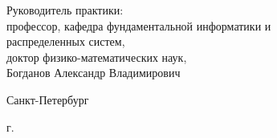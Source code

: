 \begin{titlepage}
\begin{center}
\begin{flushright}
\begin{minipage}[t]{0.65\textwidth}
\vspace{10mm}

{Руководитель практики:} \\
профессор, кафедра фундаментальной информатики и\\ распределенных систем,\\ доктор физико-математических наук, \\Богданов Александр Владимирович
\end{minipage}
\end{flushright}

\vfill 

{Санкт-Петербург}
\par{\the\year{} г.}
\end{center}
\end{titlepage}
\restoregeometry
\addtocounter{page}{1}
